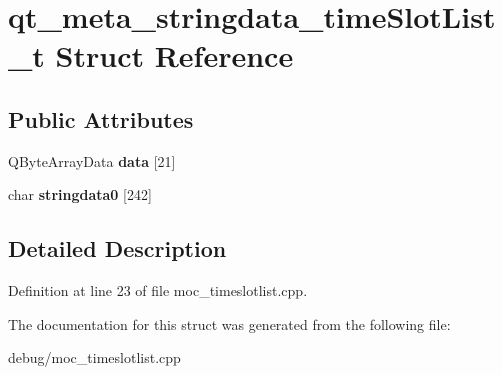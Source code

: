 \hypertarget{structqt__meta__stringdata__time_slot_list__t}{}\section{qt\+\_\+meta\+\_\+stringdata\+\_\+time\+Slot\+List\+\_\+t Struct Reference}
\label{structqt__meta__stringdata__time_slot_list__t}
\subsection*{Public Attributes}
\begin{DoxyCompactItemize}
\item 
\mbox{\label{structqt__meta__stringdata__time_slot_list__t_ac80982dd5282c1d0b48f1bd29a1ed05a}} 
Q\+Byte\+Array\+Data {\bfseries data} \mbox{[}21\mbox{]}
\item 
\mbox{\label{structqt__meta__stringdata__time_slot_list__t_a0674dd9e6ad5701d5a980de519a04cc8}} 
char {\bfseries stringdata0} \mbox{[}242\mbox{]}
\end{DoxyCompactItemize}


\subsection{Detailed Description}


Definition at line 23 of file moc\+\_\+timeslotlist.\+cpp.



The documentation for this struct was generated from the following file\+:\begin{DoxyCompactItemize}
\item 
debug/moc\+\_\+timeslotlist.\+cpp\end{DoxyCompactItemize}

